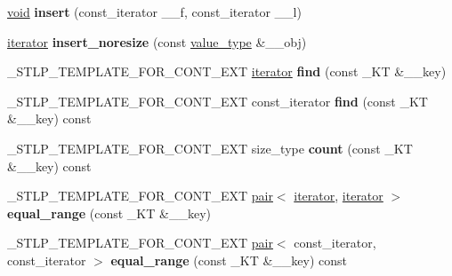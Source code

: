 \begin{DoxyCompactItemize}
\mbox{\label{classhash__multimap_ab749861bce2f37dd9631d2bc61173766}} 
\hyperlink{interfacevoid}{void} {\bfseries insert} (const\+\_\+iterator \+\_\+\+\_\+f, const\+\_\+iterator \+\_\+\+\_\+l)
\item 
\mbox{\label{classhash__multimap_a734600aff9610a251d0227eb738048ca}} 
\hyperlink{structiterator}{iterator} {\bfseries insert\+\_\+noresize} (const \hyperlink{structpair}{value\+\_\+type} \&\+\_\+\+\_\+obj)
\item 
\mbox{\label{classhash__multimap_ae57e28eb1125f6337533633c8e5d125d}} 
\+\_\+\+S\+T\+L\+P\+\_\+\+T\+E\+M\+P\+L\+A\+T\+E\+\_\+\+F\+O\+R\+\_\+\+C\+O\+N\+T\+\_\+\+E\+XT \hyperlink{structiterator}{iterator} {\bfseries find} (const \+\_\+\+KT \&\+\_\+\+\_\+key)
\item 
\mbox{\label{classhash__multimap_ad7519a5f62262f4b120f32ffc005d1c5}} 
\+\_\+\+S\+T\+L\+P\+\_\+\+T\+E\+M\+P\+L\+A\+T\+E\+\_\+\+F\+O\+R\+\_\+\+C\+O\+N\+T\+\_\+\+E\+XT const\+\_\+iterator {\bfseries find} (const \+\_\+\+KT \&\+\_\+\+\_\+key) const
\item 
\mbox{\label{classhash__multimap_a80f6c41b2391cc1b310929c83500b6e7}} 
\+\_\+\+S\+T\+L\+P\+\_\+\+T\+E\+M\+P\+L\+A\+T\+E\+\_\+\+F\+O\+R\+\_\+\+C\+O\+N\+T\+\_\+\+E\+XT size\+\_\+type {\bfseries count} (const \+\_\+\+KT \&\+\_\+\+\_\+key) const
\item 
\mbox{\label{classhash__multimap_ab9e757d07ddc4b15b0d75e68be73378e}} 
\+\_\+\+S\+T\+L\+P\+\_\+\+T\+E\+M\+P\+L\+A\+T\+E\+\_\+\+F\+O\+R\+\_\+\+C\+O\+N\+T\+\_\+\+E\+XT \hyperlink{structpair}{pair}$<$ \hyperlink{structiterator}{iterator}, \hyperlink{structiterator}{iterator} $>$ {\bfseries equal\+\_\+range} (const \+\_\+\+KT \&\+\_\+\+\_\+key)
\item 
\mbox{\label{classhash__multimap_ade5949de4d3e316465e12e6b01aa92e8}} 
\+\_\+\+S\+T\+L\+P\+\_\+\+T\+E\+M\+P\+L\+A\+T\+E\+\_\+\+F\+O\+R\+\_\+\+C\+O\+N\+T\+\_\+\+E\+XT \hyperlink{structpair}{pair}$<$ const\+\_\+iterator, const\+\_\+iterator $>$ {\bfseries equal\+\_\+range} (const \+\_\+\+KT \&\+\_\+\+\_\+key) const
\item 
\mbox{\label{classhash__multimap_ac3a566983da353ba0e0bc799e8f26af5}} 

\end{DoxyCompactItemize}
